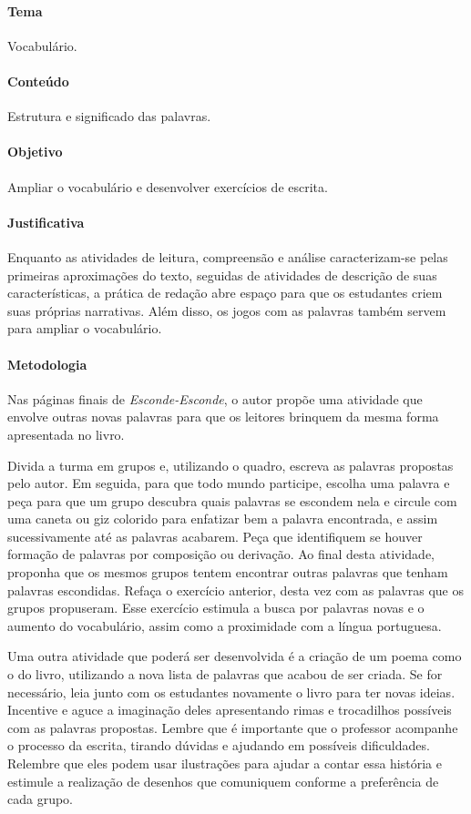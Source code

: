 \documentclass[11pt]{extarticle}
\begin{document}
\paragraph{Tema} Vocabulário. 

\paragraph{Conteúdo} Estrutura e significado das palavras.

\paragraph{Objetivo} Ampliar o vocabulário e desenvolver exercícios de escrita.

\paragraph{Justificativa} Enquanto as atividades de leitura, compreensão e análise caracterizam-se pelas primeiras aproximações do texto, seguidas de atividades de descrição de suas características, a prática de redação abre espaço para que os estudantes criem suas próprias narrativas. Além disso, os jogos com as palavras também servem para ampliar o vocabulário. 

\paragraph{Metodologia} Nas páginas finais de \textit{Esconde-Esconde}, o autor propõe uma atividade que envolve outras novas palavras para que os leitores brinquem da mesma forma apresentada no livro. 

Divida a turma em grupos e, utilizando o quadro, escreva as palavras propostas pelo autor. Em seguida, para que todo mundo participe, escolha uma palavra e peça para que um grupo descubra quais palavras se escondem nela e circule com uma caneta ou giz colorido para enfatizar bem a palavra encontrada, e assim sucessivamente até as palavras acabarem. Peça que identifiquem se houver formação de palavras por composição ou derivação. Ao final desta atividade, proponha que os mesmos grupos tentem encontrar outras palavras que tenham palavras escondidas. Refaça o exercício anterior, desta vez com as palavras que os grupos propuseram. Esse exercício estimula a busca por palavras novas e o aumento do vocabulário, assim como a proximidade com a língua portuguesa.

Uma outra atividade que poderá ser desenvolvida é a criação de um poema como o do livro, utilizando a nova lista de palavras que acabou de ser criada. Se for necessário, leia junto com os estudantes novamente o livro para ter novas ideias. Incentive e aguce a imaginação deles apresentando rimas e trocadilhos possíveis com as palavras propostas. Lembre que é importante que o professor acompanhe o processo da escrita, tirando dúvidas e ajudando em possíveis dificuldades. Relembre que eles podem usar ilustrações para ajudar a contar essa história e estimule a realização de desenhos que comuniquem conforme a preferência de cada grupo.
\end{document}
